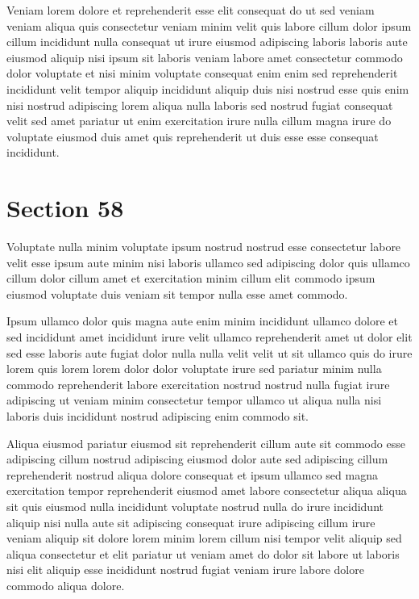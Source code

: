 \documentclass{article}
\begin{document}
Veniam lorem dolore et reprehenderit esse elit consequat do ut sed veniam veniam aliqua quis consectetur veniam minim velit quis labore cillum dolor ipsum cillum incididunt nulla consequat ut irure eiusmod adipiscing laboris laboris aute eiusmod aliquip nisi ipsum sit laboris veniam labore amet consectetur commodo dolor voluptate et nisi minim voluptate consequat enim enim sed reprehenderit incididunt velit tempor aliquip incididunt aliquip duis nisi nostrud esse quis enim nisi nostrud adipiscing lorem aliqua nulla laboris sed nostrud fugiat consequat velit sed amet pariatur ut enim exercitation irure nulla cillum magna irure do voluptate eiusmod duis amet quis reprehenderit ut duis esse esse consequat incididunt.

\section{Section 58}
Voluptate nulla minim voluptate ipsum nostrud nostrud esse consectetur labore velit esse ipsum aute minim nisi laboris ullamco sed adipiscing dolor quis ullamco cillum dolor cillum amet et exercitation minim cillum elit commodo ipsum eiusmod voluptate duis veniam sit tempor nulla esse amet commodo.

Ipsum ullamco dolor quis magna aute enim minim incididunt ullamco dolore et sed incididunt amet incididunt irure velit ullamco reprehenderit amet ut dolor elit sed esse laboris aute fugiat dolor nulla nulla velit velit ut sit ullamco quis do irure lorem quis lorem lorem dolor dolor voluptate irure sed pariatur minim nulla commodo reprehenderit labore exercitation nostrud nostrud nulla fugiat irure adipiscing ut veniam minim consectetur tempor ullamco ut aliqua nulla nisi laboris duis incididunt nostrud adipiscing enim commodo sit.

Aliqua eiusmod pariatur eiusmod sit reprehenderit cillum aute sit commodo esse adipiscing cillum nostrud adipiscing eiusmod dolor aute sed adipiscing cillum reprehenderit nostrud aliqua dolore consequat et ipsum ullamco sed magna exercitation tempor reprehenderit eiusmod amet labore consectetur aliqua aliqua sit quis eiusmod nulla incididunt voluptate nostrud nulla do irure incididunt aliquip nisi nulla aute sit adipiscing consequat irure adipiscing cillum irure veniam aliquip sit dolore lorem minim lorem cillum nisi tempor velit aliquip sed aliqua consectetur et elit pariatur ut veniam amet do dolor sit labore ut laboris nisi elit aliquip esse incididunt nostrud fugiat veniam irure labore dolore commodo aliqua dolore.
\end{document}
